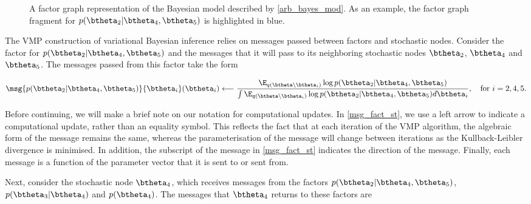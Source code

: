 \documentclass[12pt]{article}
\theoremstyle{plain}
\theoremstyle{definition}
\theoremstyle{remark}
\begin{document}
\begin{figure}
\caption{
	A factor graph representation of the Bayesian model described by \eqref{arb_bayes_mod}. As an example,
	the factor graph fragment for $p (\btheta_2 | \btheta_4, \btheta_5)$ is highlighted in blue.
}
\label{fig:arb_bayes_mod_fg}
\end{figure}

The VMP construction of variational Bayesian inference relies on messages passed between factors and stochastic
nodes. Consider the factor for $p (\btheta_2 | \btheta_4, \btheta_5)$ and the messages that it will pass to its
neighboring stochastic nodes $\btheta_2$, $\btheta_4$ and $\btheta_5$. The messages passed from this
factor take the form

\begin{equation}
	\msg{p (\btheta_2 | \btheta_4, \btheta_5)}{\btheta_i} (\btheta_i)
		\longleftarrow
			\frac{
				\E_{q(\btheta \setminus \btheta_i)} \log p (\btheta_2 | \btheta_4, \btheta_5)
			} {
				\int \E_{q(\btheta \setminus \btheta_i)} \log p (\btheta_2 | \btheta_4, \btheta_5) d\btheta_i
			},
	\quad \text{for $i = 2, 4, 5$.}
\label{msg_fact_st}
\end{equation}

\noindent Before continuing, we will make a brief note on our notation for computational updates. In \eqref{msg_fact_st},
we use a left arrow to indicate a computational update, rather than an equality symbol. This reflects the fact that at each
iteration of the VMP algorithm, the algebraic form of the message remains the same, whereas the parameterisation of the
message will change between iterations as the Kullback-Leibler divergence is minimised. In addition, the subscript
of the message in \eqref{msg_fact_st} indicates the direction of the message. Finally, each message is a function of
the parameter vector that it is sent to or sent from.

Next, consider the stochastic node $\btheta_4$, which receives messages from the factors
$p (\btheta_2 | \btheta_4, \btheta_5)$, $p (\btheta_3 | \btheta_4)$ and $p (\btheta_4)$. The messages that $\btheta_4$
returns to these factors are
\end{document}
